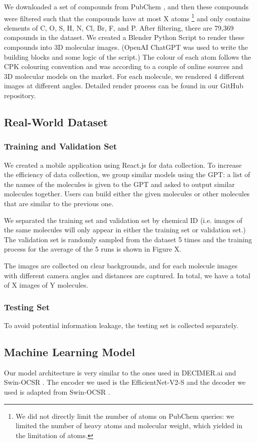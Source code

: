 \documentclass[conference]{IEEEtran}
\begin{document}
We downloaded a set of compounds from PubChem \cite{kim_pubchem_2023}, and then these compounds were filtered such that the compounds have at most X atoms \footnote{We did not directly limit the number of atoms on PubChem queries: we limited the number of heavy atoms and molecular weight, which yielded in the limitation of atoms.} and only contains elements of C, O, S, H, N, Cl, Br, F, and P.
After filtering, there are 79,369 compounds in the dataset. We created a Blender Python Script to render these compounds into 3D molecular images. (OpenAI ChatGPT was used to write the building blocks and some logic of the script.) The colour of each atom follows the CPK colouring convention and was according to a couple of online sources and 3D molecular models on the market. For each molecule, we rendered 4 different images at different angles. Detailed render process can be found in our GitHub repository. 
\subsection{Real-World Dataset}
\subsubsection{Training and Validation Set}
We created a mobile application using React.js for data collection. To increase the efficiency of data collection, we group similar models using the GPT: a list of the names of the molecules is given to the GPT and asked to output similar molecules together. Users can build either the given molecules or other molecules that are similar to the previous one. 

We separated the training set and validation set by chemical ID (i.e. images of the same molecules will only appear in either the training set or validation set.) The validation set is randomly sampled from the dataset 5 times and the training process for the average of the 5 runs is shown in Figure X.

The images are collected on clear backgrounds, and for each molecule images with different camera angles and distances are captured. In total, we have a total of X images of Y molecules.  

\subsubsection{Testing Set}
To avoid potential information leakage, the testing set is collected separately. 
\subsection{Machine Learning Model}
Our model architecture is very similar to the ones used in DECIMER.ai \cite{decimer} and Swin-OCSR \cite{swinocsr}. The encoder we used is the EfficientNet-V2-S \cite{effv2} and the decoder we used is adapted from Swin-OCSR \cite{swinocsr}. 
\end{document}
